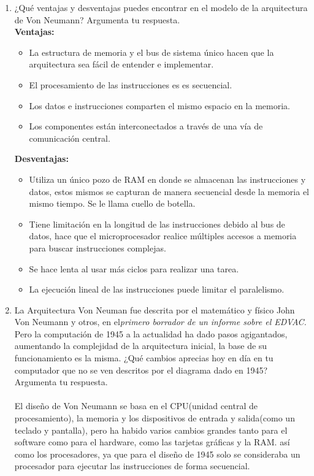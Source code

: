 \documentclass{article}
\begin{document}
\begin{enumerate}
    
    \item ¿Qué ventajas y desventajas puedes encontrar en el modelo de la arquitectura de Von Neumann? Argumenta tu respuesta.\\
    \textbf{Ventajas:}
    \begin{itemize}
        \item La estructura de memoria y el bus de sistema único hacen que la arquitectura sea fácil de entender e implementar.
        \item El procesamiento de las instrucciones es es secuencial.
        \item Los datos e instrucciones comparten el mismo espacio en la memoria.
        \item  Los componentes están interconectados a través de una vía de comunicación central.
    \end{itemize}
    \textbf{Desventajas:}
    \begin{itemize}
        \item Utiliza un único pozo de RAM en donde se almacenan las instrucciones y datos, estos mismos se capturan de manera secuencial desde la memoria el mismo tiempo. Se le llama cuello de botella.
        \item Tiene limitación en la longitud de las instrucciones debido al bus de datos, hace que el microprocesador realice múltiples accesos a memoria para buscar instrucciones complejas.
        \item Se hace lenta al usar más ciclos para realizar una tarea.
        \item La ejecución lineal de las instrucciones puede limitar el paralelismo.
    \end{itemize}
    \item La Arquitectura Von Neuman fue descrita por el matemático y físico John Von Neumann y otros, en el\textit{primero borrador de un informe sobre el EDVAC.} Pero la computación de 1945 a la actualidad ha dado pasos agigantados, aumentando la complejidad de la arquitectura inicial, la base de su funcionamiento es la misma. ¿Qué cambios aprecias hoy en día en tu computador que no se ven descritos por el diagrama dado en 1945? Argumenta tu respuesta.\\\\
    El diseño de Von Neumann se basa en el CPU(unidad central de procesamiento), la memoria y los dispositivos de entrada y salida(como un teclado y pantalla), pero ha habido varios cambios grandes tanto para el software como para el hardware, como las tarjetas gráficas y la RAM. así como los procesadores, ya que para el diseño de 1945 solo se consideraba un procesador para ejecutar las instrucciones de forma secuencial. 


\end{enumerate}
\end{document}
